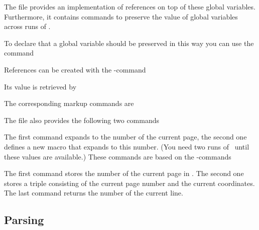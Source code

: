 The file  provides an implementation of
references on top of these global variables. Furthermore, it contains
commands to preserve the value of global variables across runs of \ant.

To declare that a global variable should be preserved in this way you can
use the command
\begin{code}
   
\end{code}

References can be created with the \AL-command
\begin{code}
    
\end{code}
Its value is retrieved by
\begin{code}
    
\end{code}
The corresponding markup commands are
\begin{code}
  \cs{\addreference}  

  \cs{\lookupreference} 
\end{code}

The file  also provides the following two commands
\begin{code}
  \cs{\currentpage}

  \cs{\saveposition} 
\end{code}
The first command expands to the number of the current page,
the second one defines a new macro  that expands to
this number. (You need two runs of \ant\ until these values are available.)
These commands are based on the \AL-commands

\begin{code}
   

   

   
\end{code}
The first command stores the number of the current page in .
The second one stores a triple consisting of the current page number and the
current coordinates. The last command returns the number of the current line.


\subsection{Parsing}   %


